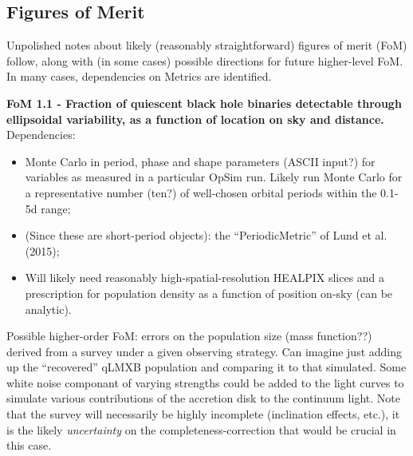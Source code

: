 
\subsection{Figures of Merit}
\label{sec:\secname:MW_Disk_metrics}


Unpolished notes about likely (reasonably straightforward) figures of
merit (FoM) follow, along with (in some cases) possible directions for
future higher-level FoM. In many cases, dependencies on
Metrics are identified.  


{\bf FoM 1.1 - Fraction of quiescent
  black hole binaries detectable through ellipsoidal variability, as a function of location on sky and distance.}
Dependencies:
\begin{itemize}
  \item Monte Carlo in period, phase and shape parameters (ASCII input?) for variables as measured in a particular OpSim run. Likely run Monte Carlo for a representative number (ten?) of well-chosen orbital periods within the 0.1-5d range;
  \item (Since these are short-period objects): the ``PeriodicMetric'' of Lund et al. (2015);
  \item Will likely need reasonably high-spatial-resolution HEALPIX slices and a prescription for population density as a function of position on-sky (can be analytic).
\end{itemize}
Possible higher-order FoM: errors on the population size (mass
function??) derived from a survey under a given observing
strategy. Can imagine just adding up the ``recovered'' qLMXB
population and comparing it to that simulated. Some white noise componant of varying strengths could be
added to the light curves to simulate various contributions of the accretion disk to the continuum light. 
Note that the survey will necessarily be highly incomplete (inclination effects, etc.), it
is the likely {\it uncertainty} on the completeness-correction that
would be crucial in this case. 


